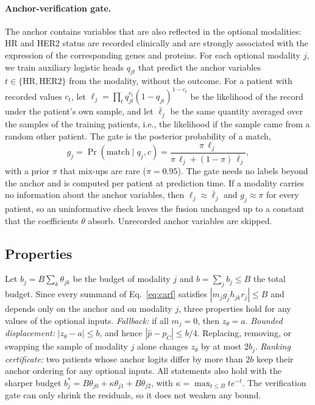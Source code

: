 \documentclass[a4paper,runningheads]{llncs}
\begin{document}
\paragraph{Anchor-verification gate.} The anchor contains variables that are also reflected in the optional modalities: HR and HER2 status are recorded clinically and are strongly associated with the expression of the corresponding genes and proteins. For each optional modality $j$, we train auxiliary logistic heads $q_{jt}$ that predict the anchor variables $t\in\{\mathrm{HR},\mathrm{HER2}\}$ from the modality, without the outcome. For a patient with recorded values $c_t$, let $\ell_j=\prod_t q_{jt}^{c_t}(1-q_{jt})^{1-c_t}$ be the likelihood of the record under the patient's own sample, and let $\bar\ell_j$ be the same quantity averaged over the samples of the training patients, i.e., the likelihood if the sample came from a random other patient. The gate is the posterior probability of a match,
\begin{equation}
 g_j = \Pr(\text{match}\mid q_j, c) = \frac{\pi\,\ell_j}{\pi\,\ell_j+(1-\pi)\,\bar\ell_j},
 \label{eq:gate}
\end{equation}
with a prior $\pi$ that mix-ups are rare ($\pi=0.95$). The gate needs no labels beyond the anchor and is computed per patient at prediction time. If a modality carries no information about the anchor variables, then $\ell_j\approx\bar\ell_j$ and $g_j\approx\pi$ for every patient, so an uninformative check leaves the fusion unchanged up to a constant that the coefficients $\theta$ absorb. Unrecorded anchor variables are skipped.

\subsection{Properties}

Let $b_j=B\sum_k\theta_{jk}$ be the budget of modality $j$ and $b=\sum_jb_j\le B$ the total budget. Since every summand of Eq.~\eqref{eq:carf} satisfies $|m_jg_jh_{jk}r_j|\le B$ and depends only on the anchor and on modality $j$, three properties hold for any values of the optional inputs. \emph{Fallback:} if all $m_j=0$, then $z_\theta=a$. \emph{Bounded displacement:} $|z_\theta-a|\le b$, and hence $|\hat p-p_C|\le b/4$. Replacing, removing, or swapping the sample of modality $j$ alone changes $z_\theta$ by at most $2b_j$. \emph{Ranking certificate:} two patients whose anchor logits differ by more than $2b$ keep their anchor ordering for any optional inputs. All statements also hold with the sharper budget $b^*_j=B\theta_{j0}+\kappa\theta_{j1}+B\theta_{j2}$, with $\kappa=\max_{t\le B}te^{-t}$. The verification gate can only shrink the residuals, so it does not weaken any bound.
\end{document}
